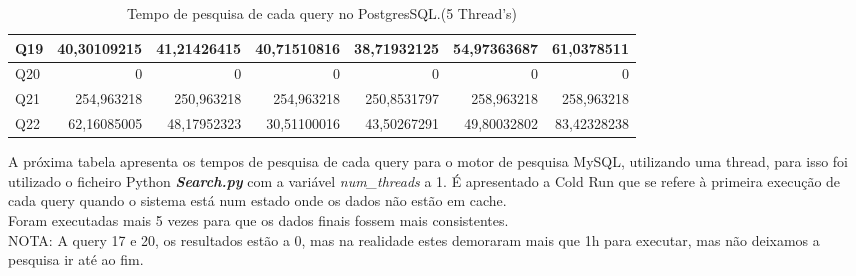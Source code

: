 \documentclass{article}
\begin{document}
\begin{table}[H]
{\begin{tabular}{|l|r|r|r|r|r|r|}
Q19&	40,30109215	&41,21426415&	40,71510816	&38,71932125&	54,97363687	&61,0378511\\ \hline
Q20&	0	& 0 & 	0 & 	0	& 0 & 	0\\ \hline
Q21&	254,963218	&250,963218	&254,963218	&250,8531797&	258,963218	&258,963218\\ \hline
Q22&	62,16085005	&48,17952323&	30,51100016	&43,50267291&	49,80032802	&83,42328238\\ \hline
    \end{tabular}}
    \caption{Tempo de pesquisa de cada query no PostgresSQL.(5 Thread's)}
    \label{tab:BC_Table6}
  \end{table}


  \clearpage

  \quad A próxima tabela apresenta os tempos de pesquisa de cada query para o motor de pesquisa MySQL, utilizando uma thread, para isso foi utilizado o ficheiro Python \textbf{\textit{Search.py}}  com a variável \textit{num\_threads} a 1. 
  \quad É apresentado a Cold Run que se refere à primeira execução de cada query quando o sistema está num estado onde os dados não estão em cache.\\
  Foram executadas mais 5 vezes para que os dados finais fossem mais consistentes.\\
  NOTA: A query 17 e 20, os resultados estão a 0, mas na realidade estes demoraram mais que 1h para executar, mas não deixamos a pesquisa ir até ao fim.
  
\end{document}
